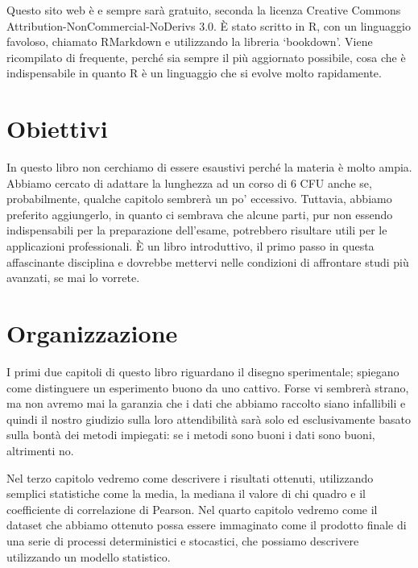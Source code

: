 \documentclass[a4paper,12pt,oneside]{book}
\begin{document}
Questo sito web è e sempre sarà gratuito, seconda la licenza Creative Commons Attribution-NonCommercial-NoDerivs 3.0. È stato scritto in R, con un linguaggio favoloso, chiamato RMarkdown e utilizzando la libreria `bookdown'. Viene ricompilato di frequente, perché sia sempre il più aggiornato possibile, cosa che è indispensabile in quanto R è un linguaggio che si evolve molto rapidamente.

\hypertarget{obiettivi}{%
\section*{Obiettivi}\label{obiettivi}}

In questo libro non cerchiamo di essere esaustivi perché la materia è molto ampia. Abbiamo cercato di adattare la lunghezza ad un corso di 6 CFU anche se, probabilmente, qualche capitolo sembrerà un po' eccessivo. Tuttavia, abbiamo preferito aggiungerlo, in quanto ci sembrava che alcune parti, pur non essendo indispensabili per la preparazione dell'esame, potrebbero risultare utili per le applicazioni professionali. È un libro introduttivo, il primo passo in questa affascinante disciplina e dovrebbe mettervi nelle condizioni di affrontare studi più avanzati, se mai lo vorrete.

\hypertarget{organizzazione}{%
\section*{Organizzazione}\label{organizzazione}}

I primi due capitoli di questo libro riguardano il disegno sperimentale; spiegano come distinguere un esperimento buono da uno cattivo. Forse vi sembrerà strano, ma non avremo mai la garanzia che i dati che abbiamo raccolto siano infallibili e quindi il nostro giudizio sulla loro attendibilità sarà solo ed esclusivamente basato sulla bontà dei metodi impiegati: se i metodi sono buoni i dati sono buoni, altrimenti no.

Nel terzo capitolo vedremo come descrivere i risultati ottenuti, utilizzando semplici statistiche come la media, la mediana il valore di chi quadro e il coefficiente di correlazione di Pearson. Nel quarto capitolo vedremo come il dataset che abbiamo ottenuto possa essere immaginato come il prodotto finale di una serie di processi deterministici e stocastici, che possiamo descrivere utilizzando un modello statistico.
\end{document}
